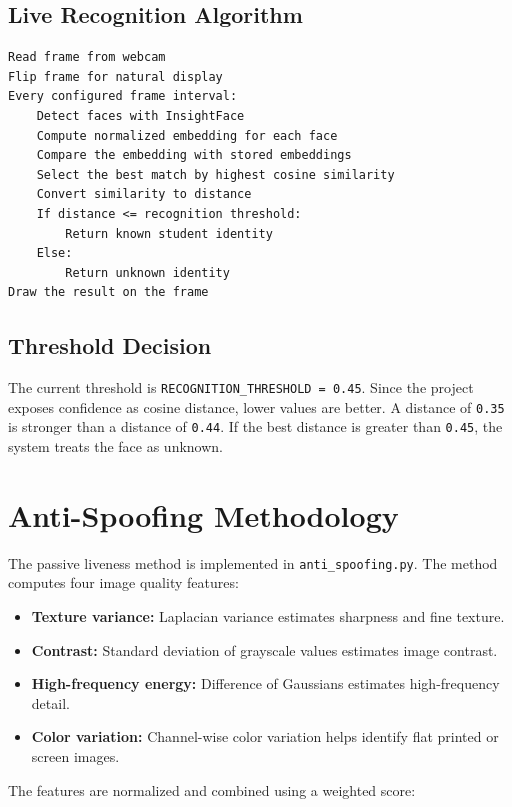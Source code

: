 \documentclass[12pt,a4paper]{report}
\newcommand{\JustifiedNormal}{\fontsize{12}{14}\selectfont\justifying\setlength{\parindent}{0pt}}
\begin{document}
\subsection{Live Recognition Algorithm}
\JustifiedNormal
\begin{lstlisting}[caption={Live recognition algorithm}]
Read frame from webcam
Flip frame for natural display
Every configured frame interval:
    Detect faces with InsightFace
    Compute normalized embedding for each face
    Compare the embedding with stored embeddings
    Select the best match by highest cosine similarity
    Convert similarity to distance
    If distance <= recognition threshold:
        Return known student identity
    Else:
        Return unknown identity
Draw the result on the frame
\end{lstlisting}

\subsection{Threshold Decision}
\JustifiedNormal
The current threshold is \texttt{RECOGNITION\_THRESHOLD = 0.45}. Since the project exposes confidence as cosine distance, lower values are better. A distance of \texttt{0.35} is stronger than a distance of \texttt{0.44}. If the best distance is greater than \texttt{0.45}, the system treats the face as unknown.

\section{Anti-Spoofing Methodology}
\JustifiedNormal
The passive liveness method is implemented in \texttt{anti\_spoofing.py}. The method computes four image quality features:

\begin{itemize}[leftmargin=*]
  \item \textbf{Texture variance:} Laplacian variance estimates sharpness and fine texture.
  \item \textbf{Contrast:} Standard deviation of grayscale values estimates image contrast.
  \item \textbf{High-frequency energy:} Difference of Gaussians estimates high-frequency detail.
  \item \textbf{Color variation:} Channel-wise color variation helps identify flat printed or screen images.
\end{itemize}

The features are normalized and combined using a weighted score:
\end{document}

